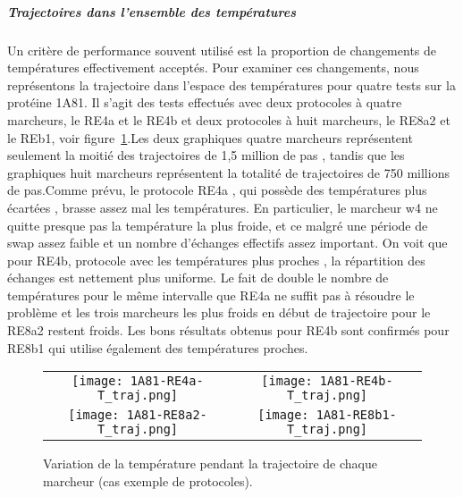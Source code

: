 \subparagraph{Trajectoires dans l'ensemble des températures}

Un critère de performance souvent utilisé est la proportion de changements de températures effectivement acceptés. Pour examiner ces changements, nous représentons la trajectoire dans l'espace des températures pour quatre tests sur la protéine 1A81. Il s'agit des tests effectués avec deux protocoles à quatre marcheurs, le RE4a et le RE4b et deux protocoles à huit marcheurs, le RE8a2 et le REb1, voir figure~\ref{graph:TRAJ_T}.Les deux graphiques quatre marcheurs représentent seulement la moitié des trajectoires de 1,5 million de pas , tandis que les graphiques huit marcheurs représentent la totalité de trajectoires de 750 millions de pas.Comme prévu, le protocole RE4a , qui possède des températures plus écartées , brasse assez mal les températures. En particulier, le marcheur w4 ne quitte presque pas la température la plus froide, et ce malgré une période de swap assez faible et un nombre d'échanges effectifs assez important. On voit que pour RE4b, protocole avec les températures plus proches , la répartition des échanges est nettement plus uniforme. Le fait de double le nombre de températures pour le même intervalle que RE4a ne suffit pas à résoudre le problème et les trois marcheurs les plus froids en début de trajectoire pour le RE8a2 restent froids. Les bons résultats obtenus pour RE4b sont confirmés pour RE8b1 qui utilise également des températures proches.     


   \begin{figure}[t]
     \centering
     \begin{tabular}{cc}
       \texttt{[image: 1A81-RE4a-T\_traj.png]} &
       \texttt{[image: 1A81-RE4b-T\_traj.png]} \\
       \texttt{[image: 1A81-RE8a2-T\_traj.png]} &
       \texttt{[image: 1A81-RE8b1-T\_traj.png]} \\
     \end{tabular}
     \caption{Variation de la température pendant la trajectoire de chaque marcheur (cas exemple de protocoles).}
\label{graph:TRAJ_T}
   \end{figure}


    \clearpage
